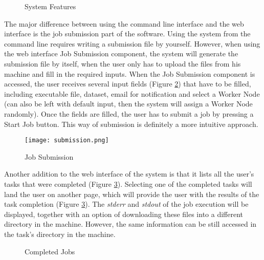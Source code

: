 \documentclass[10pt]{report}
\begin{document}
\begin{figure}[htbp]
    \centering
    \qquad
    \qquad
    \caption{System Features}
    \label{fig:features}
\end{figure}

The major difference between using the command line interface and the web interface is the job submission part of the software. Using the system from the command line requires writing a submission file by yourself. However, when using the web interface Job Submission component, the system will generate the submission file by itself, when the user only has to upload the files from his machine and fill in the required inputs. When the Job Submission component is accessed, the user receives several input fields (Figure \ref{fig:submission}) that have to be filled, including executable file, dataset, email for notification and select a Worker Node (can also be left with default input, then the system will assign a Worker Node randomly). Once the fields are filled, the user has to submit a job by pressing a Start Job button. This way of submission is definitely a more intuitive approach.
\newline

\begin{figure}[htp]
    \centering
    \texttt{[image: submission.png]}
    \caption{Job Submission}
    \label{fig:submission}
\end{figure}

Another addition to the web interface of the system is that it lists all the user's tasks that were completed (Figure \ref{fig:completed}). Selecting one of the completed tasks will land the user on another page, which will provide the user with the results of the task completion (Figure \ref{fig:completed}). The \textit{stderr} and \textit{stdout} of the job execution will be displayed, together with an option of downloading these files into a different directory in the machine. However, the same information can be still accessed in the task's directory in the machine.
\newline

\begin{figure}[htbp]
    \centering
    \qquad
    \caption{Completed Jobs}
    \label{fig:completed}
\end{figure}
\end{document}
